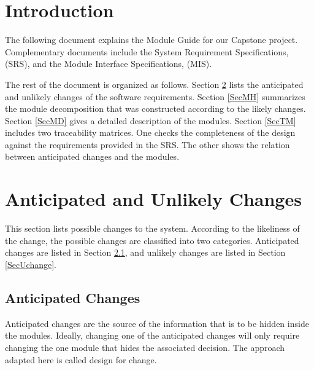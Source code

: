 \documentclass[12pt, titlepage]{article}
\begin{document}
\tableofcontents

\listoftables

\listoffigures

\newpage


\section{Introduction}

The following document explains the Module Guide for our Capstone project. Complementary documents include the System Requirement Specifications, (SRS), and the Module Interface Specifications, (MIS). 

The rest of the document is organized as follows. Section
\ref{SecChange} lists the anticipated and unlikely changes of the software
requirements. Section \ref{SecMH} summarizes the module decomposition that
was constructed according to the likely changes. Section \ref{SecMD} gives a detailed description of the modules. Section \ref{SecTM} includes two traceability matrices. One checks
the completeness of the design against the requirements provided in the SRS. The
other shows the relation between anticipated changes and the modules.

\section{Anticipated and Unlikely Changes} \label{SecChange}

This section lists possible changes to the system. According to the likeliness
of the change, the possible changes are classified into two
categories. Anticipated changes are listed in Section \ref{SecAchange}, and
unlikely changes are listed in Section \ref{SecUchange}.

\subsection{Anticipated Changes} \label{SecAchange}

Anticipated changes are the source of the information that is to be hidden
inside the modules. Ideally, changing one of the anticipated changes will only
require changing the one module that hides the associated decision. The approach
adapted here is called design for
change.
\end{document}
